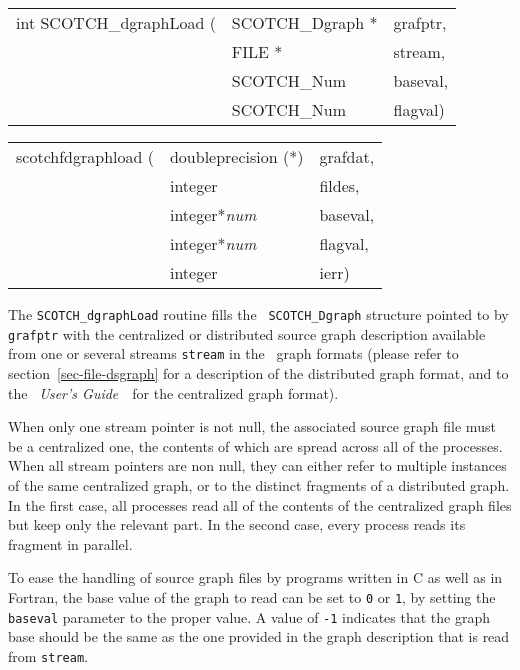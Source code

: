 \begin{itemize}
\progsyn

{\tt\begin{tabular}{l@{}ll}
int SCOTCH\_dgraphLoad ( & SCOTCH\_Dgraph * & grafptr, \\
                         & FILE *           & stream, \\
                         & SCOTCH\_Num      & baseval, \\
                         & SCOTCH\_Num      & flagval)
\end{tabular}}

{\tt\begin{tabular}{l@{}ll}
scotchfdgraphload ( & doubleprecision (*) & grafdat, \\
                    & integer             & fildes, \\
                    & integer*{\it num}   & baseval, \\
                    & integer*{\it num}   & flagval, \\
                    & integer             & ierr)
\end{tabular}}

\progdes

The {\tt SCOTCH\_dgraphLoad} routine fills the {\tt
SCOTCH\_\lbt Dgraph} structure pointed to by {\tt grafptr} with the
centralized or distributed source graph description available from
one or several streams {\tt stream} in the \scotch\ graph formats
(please refer to section~\ref{sec-file-dsgraph} for a description
of the distributed graph format, and to the {\it\scotch\ User's
Guide}~\scotchcitesuser\ for the centralized graph format).

When only one stream pointer is not null, the associated source graph
file must be a centralized one, the contents of which are spread
across all of the processes. When all stream pointers are non null,
they can either refer to multiple instances of the same centralized
graph, or to the distinct fragments of a distributed graph. In the
first case, all processes read all of the contents of the centralized
graph files but keep only the relevant part. In the second case, every
process reads its fragment in parallel.

To ease the handling of source graph files by programs written in C as
well as in Fortran, the base value of the graph to read can be set
to {\tt 0} or {\tt 1}, by setting the {\tt baseval} parameter to the
proper value. A value of {\tt -1} indicates that the graph base should
be the same as the one provided in the graph description that is read
from {\tt stream}.


\end{itemize}
